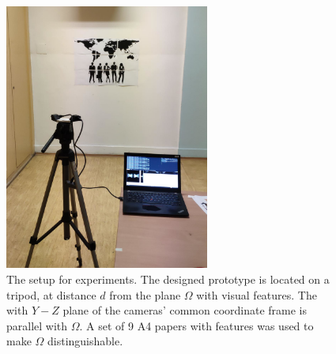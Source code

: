 \begin{figure}[ht]
    \centering
    \includegraphics[width=0.6\textwidth]{graphics/experiment_setup.png}
    \caption[The setup for experiments]{The setup for experiments. 
    The designed prototype is located on a tripod, at distance $d$ from the plane $\Omega$ with visual features.
    The with $Y-Z$ plane of the cameras' common coordinate frame is parallel with $\Omega$. 
    A set of 9 A4 papers with features was used to make $\Omega$ distinguishable.}
    \label{fig:exp_process}
\end{figure}

